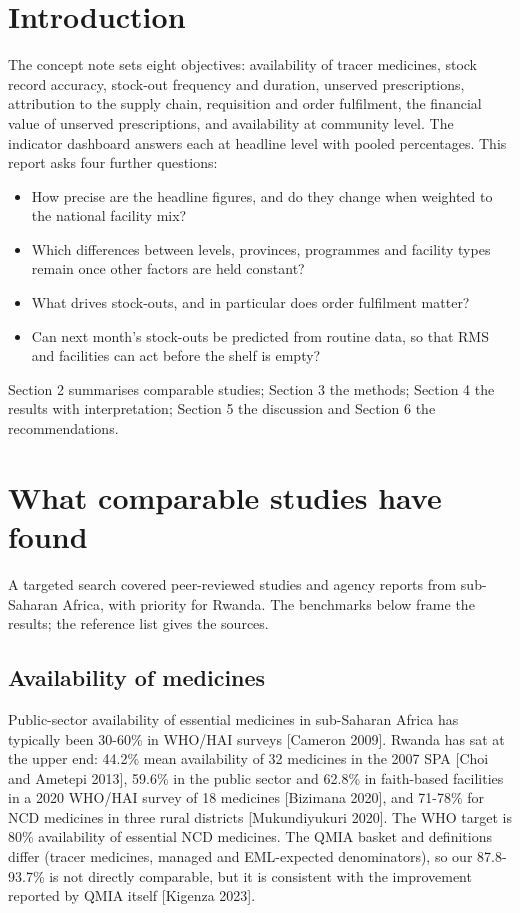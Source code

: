 \documentclass[10pt,a4paper]{article}
\begin{document}
\section{Introduction}
The concept note sets eight objectives: availability of tracer medicines, stock record accuracy, stock-out frequency and duration, unserved prescriptions, attribution to the supply chain, requisition and order fulfilment, the financial value of unserved prescriptions, and availability at community level. The indicator dashboard answers each at headline level with pooled percentages. This report asks four further questions:

\begin{itemize}\item How precise are the headline figures, and do they change when weighted to the national facility mix?
\item Which differences between levels, provinces, programmes and facility types remain once other factors are held constant?
\item What drives stock-outs, and in particular does order fulfilment matter?
\item Can next month's stock-outs be predicted from routine data, so that RMS and facilities can act before the shelf is empty?
\end{itemize}
Section 2 summarises comparable studies; Section 3 the methods; Section 4 the results with interpretation; Section 5 the discussion and Section 6 the recommendations.

\section{What comparable studies have found}
A targeted search covered peer-reviewed studies and agency reports from sub-Saharan Africa, with priority for Rwanda. The benchmarks below frame the results; the reference list gives the sources.

\subsection{Availability of medicines}
Public-sector availability of essential medicines in sub-Saharan Africa has typically been 30-60\% in WHO/HAI surveys [Cameron 2009]. Rwanda has sat at the upper end: 44.2\% mean availability of 32 medicines in the 2007 SPA [Choi and Ametepi 2013], 59.6\% in the public sector and 62.8\% in faith-based facilities in a 2020 WHO/HAI survey of 18 medicines [Bizimana 2020], and 71-78\% for NCD medicines in three rural districts [Mukundiyukuri 2020]. The WHO target is 80\% availability of essential NCD medicines. The QMIA basket and definitions differ (tracer medicines, managed and EML-expected denominators), so our 87.8-93.7\% is not directly comparable, but it is consistent with the improvement reported by QMIA itself [Kigenza 2023].
\end{document}
